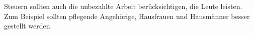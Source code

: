 Steuern sollten auch die unbezahlte Arbeit berücksichtigen, die Leute leisten.
Zum Beispiel sollten pflegende Angehörige, Hausfrauen und Hausmänner besser gestellt werden.